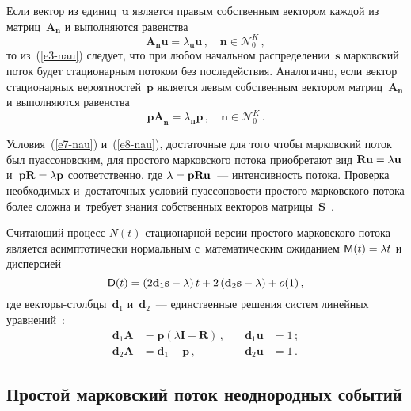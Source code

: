 \begin{multicols}{2}
  Если вектор из единиц~$\mathbf{u}$ является правым собственным 
вектором каждой из матриц~$\mathbf{A}_{\mathbf{n}}$ и выполняются 
равенства 
  \begin{equation}
  \mathbf{A}_{\mathbf{n}}\mathbf{u}=\lambda_{\mathbf{u}}\mathbf{u}\,,\quad
  \mathbf{n}\in \boldsymbol{\mathcal{N}}_0^K\,,
  \label{e7-nau}
  \end{equation}
то из~(\ref{e3-nau}) следует, что при любом начальном 
распределении~$\mathbf{s}$ марковский поток будет стационарным потоком 
без последействия. Аналогично, если вектор стационарных 
вероятностей~$\mathbf{p}$ является левым собственным вектором 
матриц~$\mathbf{A}_{\mathbf{n}}$ и выполняются равенства 
\begin{equation}
\mathbf{pA}_{\mathbf{n}}=\lambda_{\mathbf{n}}\mathbf{p}\,,\quad
\mathbf{n}\in \boldsymbol{\mathcal{N}}_0^K\,.
\label{e8-nau}
\end{equation}
    
Условия~(\ref{e7-nau}) и~(\ref{e8-nau}), достаточные для того чтобы 
марковский поток был пуассоновским, для простого марковского потока 
приобретают вид $\mathbf{Ru}\hm= \lambda\mathbf{u}$ и~$\mathbf{pR}\hm= 
\lambda\mathbf{p}$ соответственно, где $\lambda\hm= \mathbf{pRu}$~--- 
интенсивность потока. Проверка необходимых и~достаточных условий 
пуассоновости простого марковского потока более сложна и~требует знания 
собственных векторов матрицы~$\mathbf{S}$~\cite{13-nau}.
  
  Считающий процесс $N(t)$ стационарной версии простого марковского 
потока является асимптотически нормальным с~математическим ожиданием 
${\sf M}(t)\hm=\lambda t$ и дисперсией
  $$
  {\sf D}(t)=\left( 2\mathbf{d}_1\mathbf{s}-\lambda\right) t +2\left( 
\mathbf{d}_2\mathbf{s}-\lambda\right) +o(1)\,,
  $$
где векторы-столб\-цы~$\mathbf{d}_1$ и~$\mathbf{d}_2$~--- единственные 
решения систем линейных уравнений~\cite{2-nau}:
\begin{alignat*}{2}
\mathbf{d}_1\mathbf{A} &=\mathbf{p}(\lambda \mathbf{I}-\mathbf{R})\,,&\quad
\mathbf{d}_1\mathbf{u}&=1\,;\\
\mathbf{d}_2\mathbf{A}&=\mathbf{d}_1 -\mathbf{p}\,, &\quad
\mathbf{d}_2\mathbf{u}&=1\,.
\end{alignat*}
    
\subsection{Простой марковский поток неоднородных событий}


\end{multicols}
